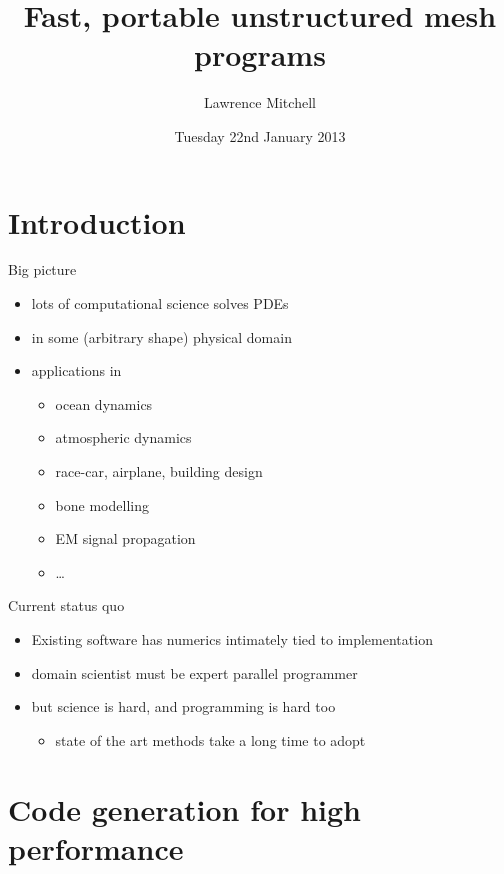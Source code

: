 \documentclass[bigger]{beamer}
\institute{EPCC, The University of Edinburgh}
\author{Lawrence Mitchell}
\date{Tuesday 22nd January 2013}
\title{Fast, portable unstructured mesh programs}
\begin{document}
\begin{frame}
\maketitle
\end{frame}


\section{Introduction}
\label{sec:orgheadline3}


\begin{frame}[label={sec:orgheadline1}]{Big picture}
\begin{itemize}
\item lots of computational science solves PDEs
\item in some (arbitrary shape) physical domain
\item applications in
\begin{itemize}
\item ocean dynamics
\item atmospheric dynamics
\item race-car, airplane, building design
\item bone modelling
\item EM signal propagation
\item \ldots{}
\end{itemize}
\end{itemize}
\end{frame}

\begin{frame}[label={sec:orgheadline2}]{Current status quo}
\begin{itemize}
\item Existing software has numerics intimately tied to implementation
\item domain scientist must be expert parallel programmer
\item but science is hard, and programming is hard too
\begin{itemize}
\item state of the art methods take a long time to adopt
\end{itemize}
\end{itemize}
\end{frame}

\section{Code generation for high performance}
\label{sec:orgheadline16}
\end{document}
